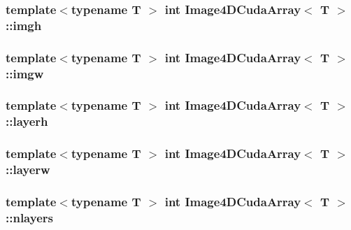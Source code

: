 \subsubsection[{\texorpdfstring{imgh}{imgh}}]{\setlength{\rightskip}{0pt plus 5cm}template$<$typename T $>$ int {\bf Image4\+D\+Cuda\+Array}$<$ T $>$\+::imgh}\hypertarget{struct_image4_d_cuda_array_abdb9e7f88b589af46a4cf0b543ecac9b}{}\label{struct_image4_d_cuda_array_abdb9e7f88b589af46a4cf0b543ecac9b}
\subsubsection[{\texorpdfstring{imgw}{imgw}}]{\setlength{\rightskip}{0pt plus 5cm}template$<$typename T $>$ int {\bf Image4\+D\+Cuda\+Array}$<$ T $>$\+::imgw}\hypertarget{struct_image4_d_cuda_array_a7f23302d874ffff216e49e33e9b5ca41}{}\label{struct_image4_d_cuda_array_a7f23302d874ffff216e49e33e9b5ca41}
\subsubsection[{\texorpdfstring{layerh}{layerh}}]{\setlength{\rightskip}{0pt plus 5cm}template$<$typename T $>$ int {\bf Image4\+D\+Cuda\+Array}$<$ T $>$\+::layerh}\hypertarget{struct_image4_d_cuda_array_a1fd2bc8556d6c750f67799dacad099a4}{}\label{struct_image4_d_cuda_array_a1fd2bc8556d6c750f67799dacad099a4}
\subsubsection[{\texorpdfstring{layerw}{layerw}}]{\setlength{\rightskip}{0pt plus 5cm}template$<$typename T $>$ int {\bf Image4\+D\+Cuda\+Array}$<$ T $>$\+::layerw}\hypertarget{struct_image4_d_cuda_array_aef314c7da09f67d8095bfb93a5102906}{}\label{struct_image4_d_cuda_array_aef314c7da09f67d8095bfb93a5102906}
\subsubsection[{\texorpdfstring{nlayers}{nlayers}}]{\setlength{\rightskip}{0pt plus 5cm}template$<$typename T $>$ int {\bf Image4\+D\+Cuda\+Array}$<$ T $>$\+::nlayers}\hypertarget{struct_image4_d_cuda_array_a2cc68c6d8492e7a0d2fa194cc3a58187}{}\label{struct_image4_d_cuda_array_a2cc68c6d8492e7a0d2fa194cc3a58187}
